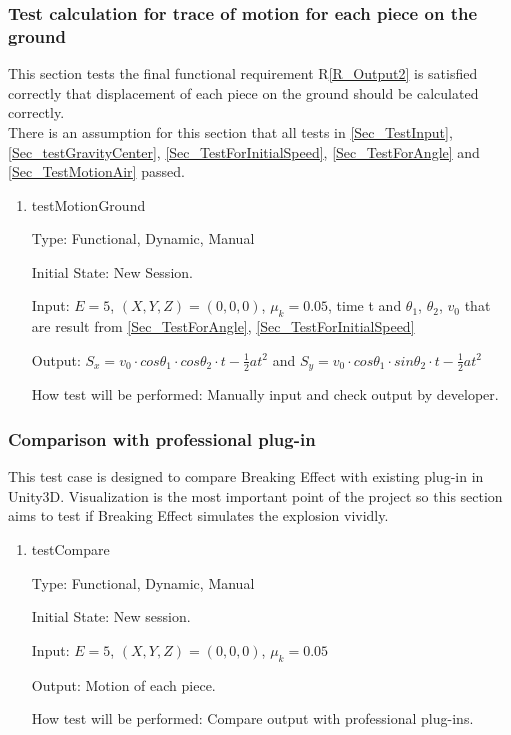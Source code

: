 \documentclass[12pt, titlepage]{article}
\newcommand{\rref}[1]{R\ref{#1}}
\begin{document}
\subsubsection{Test calculation for trace of motion for each piece on the ground}

This section tests the final functional requirement \rref{R_Output2} is satisfied correctly that displacement of each piece on the ground should be calculated correctly.\\
There is an assumption for this section that all tests in \ref{Sec_TestInput}, \ref{Sec_testGravityCenter}, \ref{Sec_TestForInitialSpeed}, \ref{Sec_TestForAngle} and \ref{Sec_TestMotionAir} passed.

\begin{enumerate}

\item{testMotionGround\\}

Type: Functional, Dynamic, Manual

Initial State: New Session.

Input: $E = 5$, $(X,Y,Z) = (0,0,0)$, $\mu_{k} = 0.05$, time t and $\theta_{1}$, $\theta_{2}$, $v_{0}$ that are result from \ref{Sec_TestForAngle}, \ref{Sec_TestForInitialSpeed}

Output: $S_{x}=v_{0}\cdot cos\theta _{1}\cdot cos\theta _{2}\cdot t-\frac{1}{2}at^{2}$ and $S_{y}=v_{0}\cdot cos\theta _{1}\cdot sin\theta _{2}\cdot t-\frac{1}{2}at^{2}$

How test will be performed: Manually input and check output by developer.

\end{enumerate}

\subsubsection{Comparison with professional plug-in}

This test case is designed to compare Breaking Effect with existing plug-in in Unity3D. Visualization is the most important point of the project so this section aims to test if Breaking Effect simulates the explosion vividly. 

\begin{enumerate}

\item{testCompare\\}

Type: Functional, Dynamic, Manual

Initial State: New session.

Input: $E = 5$, $(X,Y,Z) = (0,0,0)$, $\mu_{k} = 0.05$ 

Output: Motion of each piece.

How test will be performed: Compare output with professional plug-ins. 

\end{enumerate}
\end{document}
